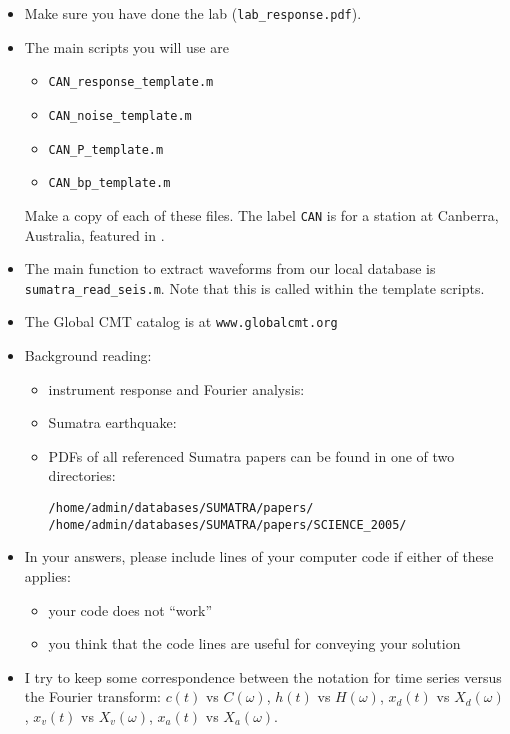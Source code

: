\documentclass[11pt,titlepage,fleqn]{article}
\newcommand{\fft}{h}
\newcommand{\ffw}{H}
\begin{document}
\begin{itemize}

\item Make sure you have done the lab (\verb+lab_response.pdf+).

\item The main scripts you will use are
%
\begin{itemize}
\item \verb+CAN_response_template.m+
\item \verb+CAN_noise_template.m+
\item \verb+CAN_P_template.m+
\item \verb+CAN_bp_template.m+
\end{itemize}
%
Make a copy of each of these files. The label \verb+CAN+ is for a station at Canberra, Australia, featured in \citet[][Figure~1]{Park2005}.

\item The main function to extract waveforms from our local database is \verb+sumatra_read_seis.m+. Note that this is called within the template scripts.

\item The Global CMT catalog is at \verb+www.globalcmt.org+

\item Background reading:

\begin{itemize}
\item instrument response and Fourier analysis: \citet[][Ch.~6]{SteinWysession}
\item Sumatra earthquake: \citep{Lay2005,Ammon2005,Park2005,Ni2005}
\item PDFs of all referenced Sumatra papers can be found in one of two directories:
%
\begin{verbatim}
/home/admin/databases/SUMATRA/papers/
/home/admin/databases/SUMATRA/papers/SCIENCE_2005/
\end{verbatim}

\end{itemize}

\item In your answers, please include lines of your computer code if either of these applies:
%
\begin{itemize}
\item your code does not ``work''
\item you think that the code lines are useful for conveying your solution
\end{itemize}

\item I try to keep some correspondence between the notation for time series versus the Fourier transform: $c(t)$ vs $C(\omega)$, $\fft(t)$ vs $\ffw(\omega)$, $x_d(t)$ vs $X_d(\omega)$, $x_v(t)$ vs $X_v(\omega)$, $x_a(t)$ vs $X_a(\omega)$.

\end{itemize}
\end{document}

